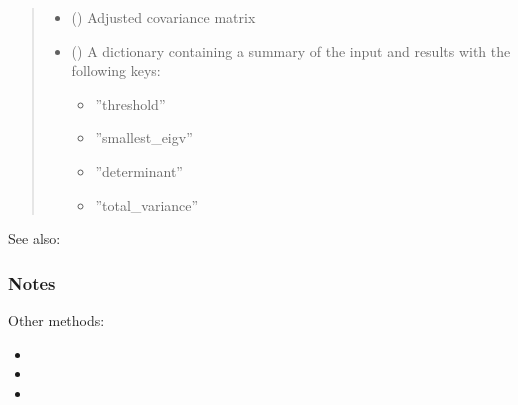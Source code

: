 \documentclass[letterpaper,10pt,english]{sphinxmanual}
\begin{document}
\begin{fulllineitems}
\begin{quote}
\begin{description}
\sphinxAtStartPar
\begin{itemize}
\item {}
\sphinxAtStartPar
{} () \textendash{} Adjusted covariance matrix

\item {}
\sphinxAtStartPar
{} () \textendash{} A dictionary containing a summary of the input and results with the
following keys:
\begin{itemize}
\item {}
\sphinxAtStartPar
”threshold”

\item {}
\sphinxAtStartPar
”smallest\_eigv”

\item {}
\sphinxAtStartPar
”determinant”

\item {}
\sphinxAtStartPar
”total\_variance”

\end{itemize}

\end{itemize}


\end{description}\end{quote}


\begin{sphinxseealso}{See also:}

\sphinxAtStartPar
{}


\end{sphinxseealso}

\subsubsection*{Notes}

\sphinxAtStartPar
Other methods:
\begin{itemize}
\item {}
\sphinxAtStartPar
{}

\item {}
\sphinxAtStartPar
{}

\item {}
\sphinxAtStartPar
{}

\end{itemize}

\end{fulllineitems}
\end{document}
